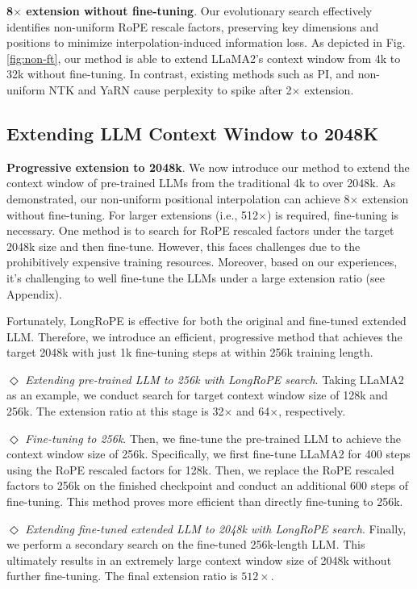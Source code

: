 \textbf{8$\times$ extension without fine-tuning}. Our evolutionary search  effectively identifies non-uniform RoPE rescale factors, preserving key dimensions and positions to minimize interpolation-induced information loss. As depicted in Fig.\ref{fig:non-ft}, our method is able to extend LLaMA2's context window from 4k to 32k without fine-tuning. In contrast, existing methods such as PI, and non-uniform NTK and YaRN cause perplexity to spike after 2$\times$ extension.

\subsection{Extending LLM Context Window to 2048K}
\label{sec:extendto2048k}

\textbf{Progressive extension to 2048k}. We now introduce our method  to extend the context window of pre-trained LLMs from the traditional 4k to over 2048k. As demonstrated, our non-uniform positional interpolation can achieve 8$\times$ extension without fine-tuning. For larger extensions (i.e., 512$\times$) is required, fine-tuning is necessary. One method is to search for RoPE rescaled factors under the target 2048k size and then fine-tune. However, this faces challenges due to the prohibitively expensive training resources. Moreover,  based on our experiences, it's challenging to well fine-tune the LLMs under a  large extension ratio (see Appendix). 

Fortunately, LongRoPE is effective for both the original and fine-tuned extended LLM. Therefore, we introduce an efficient, progressive method that achieves the target 2048k with just 1k fine-tuning steps at within 256k training length.

$\Diamond$ \textit{Extending pre-trained LLM to 256k with LongRoPE search}. Taking LLaMA2 as an example, we conduct search for target context window size of 128k and 256k. The extension ratio at this stage is 32$\times$ and 64$\times$, respectively.

 $\Diamond$ \textit{Fine-tuning to 256k}. Then, we fine-tune the pre-trained LLM to achieve the context window size of 256k. 	Specifically, we first fine-tune LLaMA2 for 400 steps using the RoPE rescaled factors for 128k. Then, we replace the RoPE rescaled factors to 256k on the finished checkpoint and conduct an additional 600 steps of fine-tuning. This method proves more efficient than directly fine-tuning to 256k.

 $\Diamond$ \textit{Extending fine-tuned extended LLM to 2048k with LongRoPE search}. Finally, we perform a secondary  search on the fine-tuned 256k-length LLM. This ultimately results in an extremely large context window size of 2048k without further fine-tuning. The final extension ratio is  $512\times$.	

